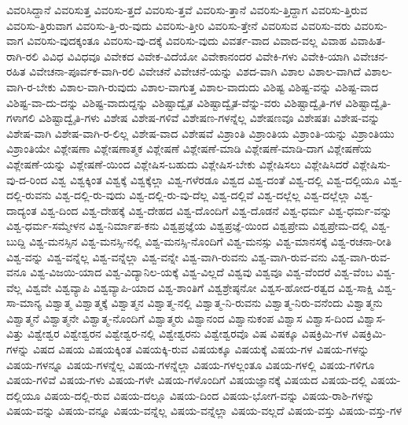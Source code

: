 {ವಿವರಿಸಿದ್ದಾನೆ
ವಿವರಿಸುತ್ತ
ವಿವರಿಸು-ತ್ತದೆ
ವಿವರಿಸು-ತ್ತವೆ
ವಿವರಿಸು-ತ್ತಾನೆ
ವಿವರಿಸು-ತ್ತಿದ್ದಾಗ
ವಿವರಿಸು-ತ್ತಿರುವ
ವಿವರಿಸು-ತ್ತಿರುವಾಗ
ವಿವರಿಸು-ತ್ತಿ-ರು-ವುದು
ವಿವರಿಸು-ತ್ತೀರಿ
ವಿವರಿಸು-ತ್ತೇನೆ
ವಿವರಿಸುವ
ವಿವರಿಸು-ವರು
ವಿವರಿಸು-ವಾಗ
ವಿವರಿಸು-ವುದಕ್ಕಂತೂ
ವಿವರಿಸು-ವು-ದಕ್ಕೆ
ವಿವರಿಸು-ವುದು
ವಿವರ್ತ-ವಾದ
ವಿವಾದ-ವಲ್ಲ
ವಿವಾಹ
ವಿವಾಹಿತ-ರಾಗಿ-ರಲಿ
ವಿವಿಧ
ವಿವಿಧವೂ
ವಿವೇಕದ
ವಿವೇಕ-ವಿದೆಯೋ
ವಿವೇಕಾನಂದರ
ವಿವೇಕಿ-ಗಳು
ವಿವೇಕಿ-ಯಾಗಿ
ವಿವೇಚನ-ರಹಿತ
ವಿವೇಚನಾ-ಪೂರ್ವಕ-ವಾಗಿ-ರಲಿ
ವಿವೇಚನೆ
ವಿವೇಚನೆ-ಯನ್ನು
ವಿಶದ-ವಾಗಿ
ವಿಶಾಲ
ವಿಶಾಲ-ವಾಗಿದೆ
ವಿಶಾಲ-ವಾಗಿ-ರ-ಬೇಕು
ವಿಶಾಲ-ವಾಗಿ-ರುವುದು
ವಿಶಾಲ-ವಾಗುತ್ತ
ವಿಶಾಲ-ವಾದುದು
ವಿಶಿಷ್ಟ
ವಿಶಿಷ್ಟ-ವನ್ನು
ವಿಶಿಷ್ಟ-ವಾದ
ವಿಶಿಷ್ಟ-ವಾ-ದು-ದನ್ನು
ವಿಶಿಷ್ಟ-ವಾದುದ್ದನ್ನು
ವಿಶಿಷ್ಟಾದ್ವೈತ
ವಿಶಿಷ್ಟಾದ್ವೈತ-ವೆನ್ನು-ವರು
ವಿಶಿಷ್ಟಾದ್ವೈತಿ-ಗಳ
ವಿಶಿಷ್ಟಾದ್ವೈತಿ-ಗಳಾಗಲಿ
ವಿಶಿಷ್ಟಾದ್ವೈತಿ-ಗಳು
ವಿಶೇಷ
ವಿಶೇಷ-ಗಳಿವೆ
ವಿಶೇಷಣ-ಗಳನ್ನೆಲ್ಲ
ವಿಶೇಷಣವೂ
ವಿಶೇಷತಃ
ವಿಶೇಷ-ವನ್ನು
ವಿಶೇಷ-ವಾಗಿ
ವಿಶೇಷ-ವಾಗಿ-ರ-ಲಿಲ್ಲ
ವಿಶೇಷ-ವಾದ
ವಿಶೇಷವೆ
ವಿಶ್ರಾಂತಿ
ವಿಶ್ರಾಂತಿಯ
ವಿಶ್ರಾಂತಿ-ಯನ್ನು
ವಿಶ್ರಾಂತಿಯು
ವಿಶ್ರಾಂತಿಯೇ
ವಿಶ್ಲೇಷಣಾ
ವಿಶ್ಲೇಷಣಾತ್ಮಕ
ವಿಶ್ಲೇಷಣೆ
ವಿಶ್ಲೇಷಣೆ-ಮಾಡಿ
ವಿಶ್ಲೇಷಣೆ-ಮಾಡಿ-ದಾಗ
ವಿಶ್ಲೇಷಣೆಯ
ವಿಶ್ಲೇಷಣೆ-ಯನ್ನು
ವಿಶ್ಲೇಷಣೆ-ಯಿಂದ
ವಿಶ್ಲೇಷಿಸ-ಬಹುದು
ವಿಶ್ಲೇಷಿಸ-ಬೇಕು
ವಿಶ್ಲೇಷಿಸಲು
ವಿಶ್ಲೇಷಿಸಿದರೆ
ವಿಶ್ಲೇಷಿಸು-ವು-ದ-ರಿಂದ
ವಿಶ್ವ
ವಿಶ್ವಕ್ಕಿಂತ
ವಿಶ್ವಕ್ಕೆ
ವಿಶ್ವಕ್ಕೆಲ್ಲಾ
ವಿಶ್ವ-ಗಳೆರಡೂ
ವಿಶ್ವದ
ವಿಶ್ವ-ದಂತೆ
ವಿಶ್ವ-ದಲ್ಲಿ
ವಿಶ್ವ-ದಲ್ಲಿಯೂ
ವಿಶ್ವ-ದಲ್ಲಿ-ರುವನು
ವಿಶ್ವ-ದಲ್ಲಿ-ರು-ವುದು
ವಿಶ್ವ-ದಲ್ಲಿ-ರು-ವು-ದೆಲ್ಲ
ವಿಶ್ವ-ದಲ್ಲಿವೆ
ವಿಶ್ವ-ದಲ್ಲೆಲ್ಲ
ವಿಶ್ವ-ದಲ್ಲೆಲ್ಲಾ
ವಿಶ್ವ-ದಾದ್ಯಂತ
ವಿಶ್ವ-ದಿಂದ
ವಿಶ್ವ-ದೇಹಕ್ಕೆ
ವಿಶ್ವ-ದೇಹದ
ವಿಶ್ವ-ದೊಂದಿಗೆ
ವಿಶ್ವ-ದೊಡನೆ
ವಿಶ್ವ-ಧರ್ಮ
ವಿಶ್ವ-ಧರ್ಮ-ವನ್ನು
ವಿಶ್ವ-ಧರ್ಮ-ಸಮ್ಮೇಳನ
ವಿಶ್ವ-ನಿರ್ಮಾಪ-ಕನು
ವಿಶ್ವಪ್ರಜ್ಞೆಯ
ವಿಶ್ವಪ್ರಜ್ಞೆ-ಯಿಂದ
ವಿಶ್ವಪ್ರೇಮ
ವಿಶ್ವಪ್ರೇಮ-ದಲ್ಲಿ
ವಿಶ್ವ-ಬುದ್ದಿ
ವಿಶ್ವ-ಮನಸ್ಸಿನ
ವಿಶ್ವ-ಮನಸ್ಸಿ-ನಲ್ಲಿ
ವಿಶ್ವ-ಮನಸ್ಸಿ-ನೊಂದಿಗೆ
ವಿಶ್ವ-ಮನಸ್ಸು
ವಿಶ್ವ-ಮಾನಸಕ್ಕೆ
ವಿಶ್ವ-ರಚನಾ-ರೀತಿ
ವಿಶ್ವ-ವನ್ನು
ವಿಶ್ವ-ವನ್ನೆಲ್ಲ
ವಿಶ್ವ-ವನ್ನೆಲ್ಲಾ
ವಿಶ್ವ-ವನ್ನೇ
ವಿಶ್ವ-ವಾಗಿ-ರುವನು
ವಿಶ್ವ-ವಾಗಿ-ರುವ-ವನು
ವಿಶ್ವ-ವಾಗಿ-ರುವ-ವನೂ
ವಿಶ್ವ-ವಿಜಯಿ-ಯಾದ
ವಿಶ್ವ-ವಿದ್ಯಾನಿಲ-ಯಕ್ಕೆ
ವಿಶ್ವ-ವಿಲ್ಲದೆ
ವಿಶ್ವವು
ವಿಶ್ವವೂ
ವಿಶ್ವ-ವೆಂದರೆ
ವಿಶ್ವ-ವೆಂಬ
ವಿಶ್ವ-ವೆಲ್ಲ
ವಿಶ್ವವೇ
ವಿಶ್ವವ್ಯಾಪಿ
ವಿಶ್ವವ್ಯಾಪಿ-ಯಾದ
ವಿಶ್ವ-ಶಾಂತಿಗೆ
ವಿಶ್ವಶ್ರೇಷ್ಠನೋ
ವಿಶ್ವಸ-ಹೋದ-ರತ್ವದ
ವಿಶ್ವ-ಸಾಕ್ಷಿ
ವಿಶ್ವ-ಸಾ-ಮಾನ್ಯ
ವಿಶ್ವಾತ್ಮ
ವಿಶ್ವಾತ್ಮಕ್ಕೆ
ವಿಶ್ವಾತ್ಮನ
ವಿಶ್ವಾತ್ಮ-ನಲ್ಲಿ
ವಿಶ್ವಾತ್ಮ-ನಿ-ರುವನು
ವಿಶ್ವಾತ್ಮ-ನಿರು-ವನೆಂದು
ವಿಶ್ವಾತ್ಮನು
ವಿಶ್ವಾತ್ಮನೆ
ವಿಶ್ವಾತ್ಮನೇ
ವಿಶ್ವಾತ್ಮ-ನೊಂದಿಗೆ
ವಿಶ್ವಾತ್ಮರು
ವಿಶ್ವಾನಂದ
ವಿಶ್ವಾನುಕಂಪ
ವಿಶ್ವಾಸ
ವಿಶ್ವಾಸ-ದಿಂದ
ವಿಶ್ವಾಸ-ವಿತ್ತು
ವಿಶ್ವೇಶ್ವರ
ವಿಶ್ವೇಶ್ವರನ
ವಿಶ್ವೇಶ್ವರ-ನಲ್ಲಿ
ವಿಶ್ವೇಶ್ವರನು
ವಿಶ್ವೇಶ್ವರವೊ
ವಿಷ
ವಿಷಕ್ಕೂ
ವಿಷಕ್ರಿಮಿ-ಗಳ
ವಿಷಕ್ರಿಮಿ-ಗಳನ್ನು
ವಿಷದ
ವಿಷಯ
ವಿಷಯಕ್ಕಿಂತ
ವಿಷಯಕ್ಕಿ-ರುವ
ವಿಷಯಕ್ಕೂ
ವಿಷಯಕ್ಕೆ
ವಿಷಯ-ಗಳ
ವಿಷಯ-ಗಳನ್ನು
ವಿಷಯ-ಗಳನ್ನೂ
ವಿಷಯ-ಗಳನ್ನೆಲ್ಲ
ವಿಷಯ-ಗಳನ್ನೆಲ್ಲಾ
ವಿಷಯ-ಗಳಲ್ಲಂತೂ
ವಿಷಯ-ಗಳಲ್ಲಿ
ವಿಷಯ-ಗಳಿಗೂ
ವಿಷಯ-ಗಳಿವೆ
ವಿಷಯ-ಗಳು
ವಿಷಯ-ಗಳೇ
ವಿಷಯ-ಗಳೊಂದಿಗೆ
ವಿಷಯಜ್ಞಾನಕ್ಕೆ
ವಿಷಯದ
ವಿಷಯ-ದಲ್ಲಿ
ವಿಷಯ-ದಲ್ಲಿಯೂ
ವಿಷಯ-ದಲ್ಲಿ-ರುವ
ವಿಷಯ-ದಲ್ಲೂ
ವಿಷಯ-ದಿಂದ
ವಿಷಯ-ಭೋಗ-ವನ್ನು
ವಿಷಯ-ರಾಶಿ-ಗಳನ್ನು
ವಿಷಯ-ವನ್ನು
ವಿಷಯ-ವನ್ನೂ
ವಿಷಯ-ವನ್ನೆಲ್ಲ
ವಿಷಯ-ವನ್ನೆಲ್ಲಾ
ವಿಷಯ-ವಲ್ಲದೆ
ವಿಷಯ-ವಸ್ತು
ವಿಷಯ-ವಸ್ತು-ಗಳ
}
